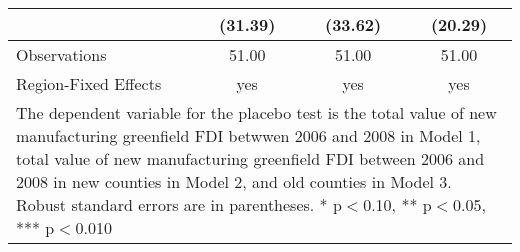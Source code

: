 \begin{table}[!htbp]
\begin{tabular}{l*{3}{c}}
                    &     (31.39)   &     (33.62)   &     (20.29)   \\
\hline
Observations        &       51.00   &       51.00   &       51.00   \\
Region-Fixed Effects&         yes   &         yes   &         yes   \\
\hline\hline
\multicolumn{4}{p{\linewidth}}{\footnotesize The dependent variable for the placebo test is the total value of new manufacturing greenfield FDI betwwen 2006 and 2008 in Model 1, total value of new manufacturing greenfield FDI between 2006 and 2008 in new counties in Model 2, and old counties in Model 3. Robust standard errors are in parentheses. * p$<$0.10, ** p$<$0.05, *** p$<$0.010}\\
\end{tabular}
\end{table}

